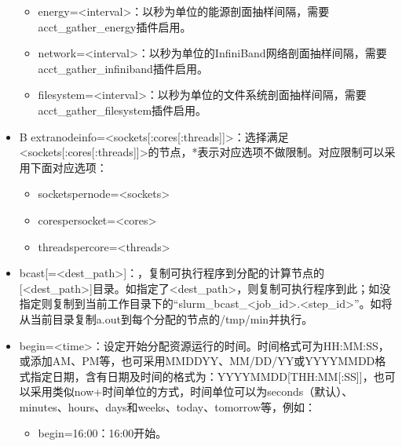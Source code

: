 \documentclass[a4paper,12pt,english]{sphinxmanual}
\begin{document}
\begin{itemize}
\begin{itemize}
\item {} 
\sphinxAtStartPar
energy=<interval>：以秒为单位的能源剖面抽样间隔，需要acct\_gather\_energy插件启用。

\item {} 
\sphinxAtStartPar
network=<interval>：以秒为单位的InfiniBand网络剖面抽样间隔，需要acct\_gather\_infiniband插件启用。

\item {} 
\sphinxAtStartPar
filesystem=<interval>：以秒为单位的文件系统剖面抽样间隔，需要acct\_gather\_filesystem插件启用。

\end{itemize}

\item {} 
\sphinxAtStartPar
\sphinxhyphen{}B \sphinxhyphen{}\sphinxhyphen{}extra\sphinxhyphen{}node\sphinxhyphen{}info=<sockets{[}:cores{[}:threads{]}{]}>：选择满足<sockets{[}:cores{[}:threads{]}{]}>的节点，*表示对应选项不做限制。对应限制可以采用下面对应选项：
\begin{itemize}
\item {} 
\sphinxAtStartPar
\sphinxhyphen{}\sphinxhyphen{}sockets\sphinxhyphen{}per\sphinxhyphen{}node=<sockets>

\item {} 
\sphinxAtStartPar
\sphinxhyphen{}\sphinxhyphen{}cores\sphinxhyphen{}per\sphinxhyphen{}socket=<cores>

\item {} 
\sphinxAtStartPar
\sphinxhyphen{}\sphinxhyphen{}threads\sphinxhyphen{}per\sphinxhyphen{}core=<threads>

\end{itemize}

\item {} 
\sphinxAtStartPar
\sphinxhyphen{}\sphinxhyphen{}bcast{[}=<dest\_path>{]}：，复制可执行程序到分配的计算节点的{[}<dest\_path>{]}目录。如指定了<dest\_path>，则复制可执行程序到此；如没指定则复制到当前工作目录下的“slurm\_bcast\_<job\_id>.<step\_id>”。如将从当前目录复制a.out到每个分配的节点的/tmp/min并执行。

\item {} 
\sphinxAtStartPar
\sphinxhyphen{}\sphinxhyphen{}begin=<time>：设定开始分配资源运行的时间。时间格式可为HH:MM:SS，或添加AM、PM等，也可采用MMDDYY、MM/DD/YY或YYYY\sphinxhyphen{}MM\sphinxhyphen{}DD格式指定日期，含有日期及时间的格式为：YYYY\sphinxhyphen{}MM\sphinxhyphen{}DD{[}THH:MM{[}:SS{]}{]}，也可以采用类似now+时间单位的方式，时间单位可以为seconds（默认）、minutes、hours、days和weeks、today、tomorrow等，例如：
\begin{itemize}
\item {} 
\sphinxAtStartPar
\sphinxhyphen{}\sphinxhyphen{}begin=16:00：16:00开始。


\end{itemize}
\end{itemize}
\end{document}

